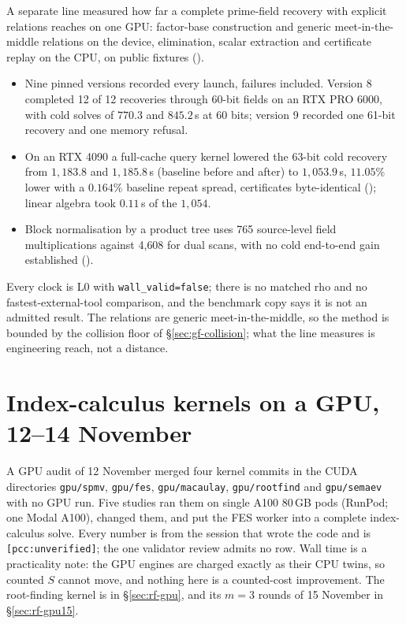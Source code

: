 A separate line measured how far a complete prime-field recovery with
explicit relations reaches on one GPU: factor-base construction and generic
meet-in-the-middle relations on the device, elimination, scalar extraction
and certificate replay on the CPU, on public fixtures
().
\begin{itemize}
\item Nine pinned versions recorded every launch, failures included. Version
  8 completed 12 of 12 recoveries through 60-bit fields on an RTX PRO 6000,
  with cold solves of $770.3$ and $845.2$\,s at 60 bits; version 9 recorded
  one 61-bit recovery and one memory refusal.
\item On an RTX 4090 a full-cache query kernel lowered the 63-bit cold
  recovery from $1{,}183.8$ and $1{,}185.8$\,s (baseline before and after) to
  $1{,}053.9$\,s, $11.05\%$ lower with a $0.164\%$ baseline repeat spread,
  certificates byte-identical ();
  linear algebra took $0.11$\,s of the $1{,}054$.
\item Block normalisation by a product tree uses 765 source-level field
  multiplications against 4{,}608 for dual scans, with no cold end-to-end
  gain established ().
\end{itemize}
Every clock is L0 with \texttt{wall\_valid=false}; there is no matched rho
and no fastest-external-tool comparison, and the benchmark copy says it is
not an admitted result. The relations are generic meet-in-the-middle, so the
method is bounded by the collision floor of \S\ref{sec:gf-collision}; what
the line measures is engineering reach, not a distance.

\section{Index-calculus kernels on a GPU, 12--14 November}\label{sec:in-gpuic}

A GPU audit of 12 November merged four kernel commits in the CUDA
directories \texttt{gpu/spmv}, \texttt{gpu/fes}, \texttt{gpu/macaulay},
\texttt{gpu/rootfind} and \texttt{gpu/semaev} with no GPU run. Five studies
ran them on single A100 80\,GB pods (RunPod; one Modal A100), changed them,
and put the FES worker into a complete index-calculus solve. Every number
is from the session that wrote the code and is \texttt{[pcc:unverified]};
the one validator review admits no row. Wall time is a practicality note:
the GPU engines are charged exactly as their CPU twins, so counted $S$
cannot move, and nothing here is a counted-cost improvement. The
root-finding kernel is in \S\ref{sec:rf-gpu}, and its $m=3$ rounds of
15 November in \S\ref{sec:rf-gpu15}.

